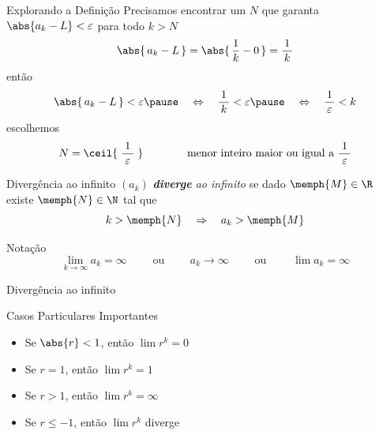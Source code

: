 \begin{frame}{Explorando a Definição}
    Precisamos encontrar um $N$ que garanta
    \(\abs{a_k-L}<\varepsilon\)
    para todo $k>N$
    \pause
    \[\abs{\,a_k-L\,} = \abs{\,\frac{1}{k}-0\,} = \frac{1}{\,k\,} \]
    \pause
    então
    \[
        \abs{\,a_k-L\,}<\varepsilon
        \pause
        \quad\Leftrightarrow\quad
        \frac{1}{\,k\,} < \varepsilon
        \pause
        \quad\Leftrightarrow\quad
        \frac{1}{\,\varepsilon\,} < k
    \]
    \pause
    escolhemos
    \[
        N = \ceil{\;\frac{1}{\;\varepsilon\;}\;}
        \qquad\qquad\text{menor inteiro maior ou igual a } \frac{1}{\;\varepsilon\;}
    \]
\end{frame}

\begin{frame}{Divergência ao infinito}
    $(a_k)$ \emph{\textbf{diverge} ao infinito} se dado
    $\memph{M}\in\R$ existe $\memph{N}\in\N$ tal que
    \[
      k > \memph{N} \quad \Rightarrow \quad a_k > \memph{M}
    \]

    \pause
    \vspace{\baselineskip}
    Notação
    \[ \lim_{k\to\infty} a_k=\infty
    \qquad\text{ ou }\qquad
    a_k\to \infty
    \qquad\text{ ou }\qquad
    \lim a_k=\infty
    \]

\end{frame}

\begin{frame}{Divergência ao infinito}
  \centering
  \scalebox{0.9}{}
\end{frame}

\begin{frame}{Casos Particulares Importantes}
  \begin{itemize}[<+->]
    \setlength\itemsep{1.5em}
    \item Se $\abs{r}<1$, \tabto{25mm} então \(\lim r^k=0\)
    \item Se $r = 1$,     \tabto{25mm} então \(\lim r^k=1\)
    \item Se $r > 1$,     \tabto{25mm} então \(\lim r^k=\infty\)
    \item Se $r \leq -1$, \tabto{25mm} então \(\lim r^k\) diverge
  \end{itemize}
\end{frame}

